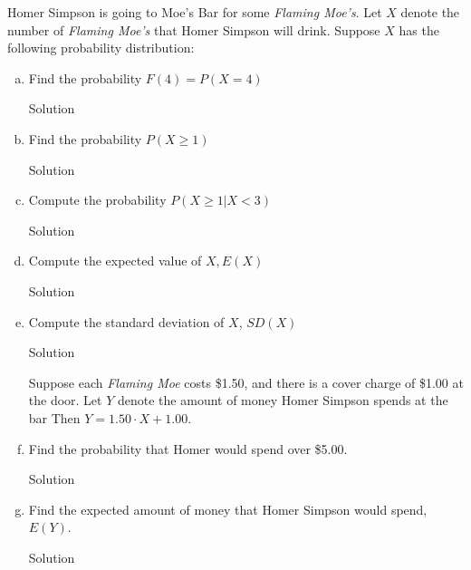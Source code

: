 \documentclass{article}
\begin{document}
\begin{spacing}{1.1}
\maketitle
\newpage
\begin{homeworkProblem}
		Homer Simpson is going to Moe's Bar for some \emph{Flaming Moe's}.  Let $X$ denote the number of \emph{Flaming Moe's} that Homer Simpson will drink.  Suppose $X$ has the following probability distribution: 
	\begin{enumerate}[(a)]
		\item Find the probability $F(4) = P(X = 4)$
			\begin{homeworkSection}{Solution}
		
			\end{homeworkSection}
		\item Find the probability $P(X \ge 1)$
			\begin{homeworkSection}{Solution}
		
			\end{homeworkSection}
		\item Compute the probability $P(X \ge 1 | X < 3)$
			\begin{homeworkSection}{Solution}
		
			\end{homeworkSection}
		\item Compute the expected value of $X, E(X)$
			\begin{homeworkSection}{Solution}
		
			\end{homeworkSection}
		\item Compute the standard deviation of $X$, $SD(X)$
			\begin{homeworkSection}{Solution}
		
			\end{homeworkSection}
	Suppose each \emph{Flaming Moe} costs \$1.50, and there is a cover charge of \$1.00 at the door.  Let $Y$ denote the amount of money Homer Simpson spends at the bar Then $Y = 1.50 \cdot X+1.00$.
		\item Find the probability that Homer would spend over \$5.00.
			\begin{homeworkSection}{Solution}
		
			\end{homeworkSection}
		\item  Find the expected amount of money that Homer Simpson would spend, $E(Y)$.
			\begin{homeworkSection}{Solution}
		

\end{homeworkSection}
\end{enumerate}
\end{homeworkProblem}
\end{spacing}
\end{document}
